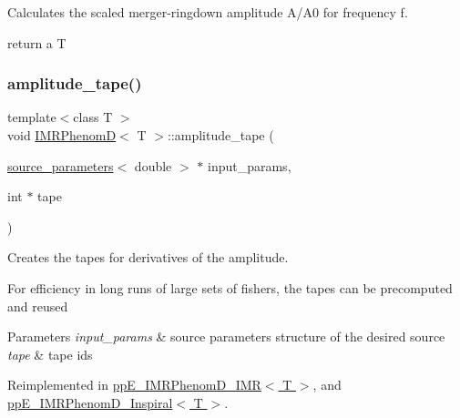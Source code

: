 Calculates the scaled merger-\/ringdown amplitude A/\+A0 for frequency f. 

return a T \mbox{\label{classIMRPhenomD_a6fbe3c51ee3eb66d332dc87a9fdf5bd4}} 
\subsubsection{\texorpdfstring{amplitude\+\_\+tape()}{amplitude\_tape()}}
{\footnotesize\ttfamily template$<$class T $>$ \\
void \hyperlink{classIMRPhenomD}{I\+M\+R\+PhenomD}$<$ T $>$\+::amplitude\+\_\+tape (\begin{DoxyParamCaption}\item[{\hyperlink{structsource__parameters}{source\+\_\+parameters}$<$ double $>$ $\ast$}]{input\+\_\+params,  }\item[{int $\ast$}]{tape }\end{DoxyParamCaption})\hspace{0.3cm}{\ttfamily [virtual]}}



Creates the tapes for derivatives of the amplitude. 

For efficiency in long runs of large sets of fishers, the tapes can be precomputed and reused 
\begin{DoxyParams}{Parameters}
{\em input\+\_\+params} & source parameters structure of the desired source \\
\hline
{\em tape} & tape ids \\
\hline
\end{DoxyParams}


Reimplemented in \hyperlink{classppE__IMRPhenomD__IMR_a3119a07c11ed53ae94823b11c5234c4f}{pp\+E\+\_\+\+I\+M\+R\+Phenom\+D\+\_\+\+I\+M\+R$<$ T $>$}, and \hyperlink{classppE__IMRPhenomD__Inspiral_a87474cac9d6086d5625f79e28970b5ed}{pp\+E\+\_\+\+I\+M\+R\+Phenom\+D\+\_\+\+Inspiral$<$ T $>$}.

\mbox{\label{classIMRPhenomD_a0fce09494daa1fee6be8297b8f18dec4}} 
